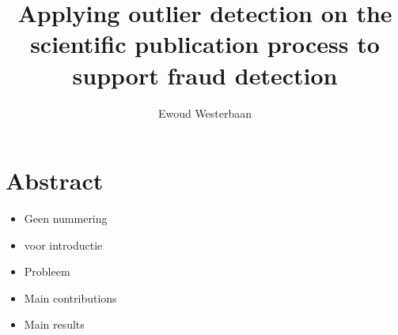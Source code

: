 \documentclass{ou-report}
\newcommand{\outline}[1]{{\color{blue} #1}}
\begin{document}
\pagestyle{plain}
\title{Applying outlier detection on the scientific publication process to support fraud detection}
\author{Ewoud Westerbaan}
%



\frontmatter 


\let\cleardoublepage\clearpage

%

%
\tableofcontents



%
%

\mainmatter
{}


\newcommand{\mi}[1]{\ensuremath{\mathit{#1}}}
\newcommand{\authors}{\mi{authors}}
\newcommand{\cites}{\mi{cites}}
\newcommand{\receives}{\mi{receives}}
\newcommand{\reviews}{\mi{reviews}}
\newcommand{\accepts}{\mi{accepts}}
\newcommand{\rejects}{\mi{rejects}}
\newcommand{\editorinchief}{\mi{EiC}}
\newcommand{\associateeditor}{\mi{AE}}
\newcommand{\Humans}{\mi{Humans}}
\newcommand{\Reviewers}{\mi{Reviewers}}
\newcommand{\Editors}{\mi{Editors}}


\chapter*{Abstract}

\outline{
\begin{itemize}
    \item Geen nummering
    \item voor introductie
    \item Probleem
    \item Main contributions
    \item Main results
\end{itemize}
}
\end{document}
